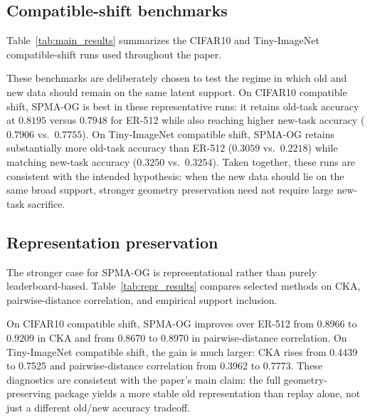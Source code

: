 \documentclass[11pt]{article}
\newcommand{\method}{\textsc{SPMA-OG}}
\begin{document}
\subsection{Compatible-shift benchmarks}
Table~\ref{tab:main_results} summarizes the CIFAR10 and Tiny-ImageNet compatible-shift runs used throughout the paper.

\begin{table}[t]
  \centering
  \caption{Fixed-seed compatible-shift results on CIFAR10 and Tiny-ImageNet.}
  \label{tab:main_results}
  \footnotesize
  \resizebox{\linewidth}{!}{}
\end{table}

These benchmarks are deliberately chosen to test the regime in which old and new data should remain on the same latent support. On CIFAR10 compatible shift, \method{} is best in these representative runs: it retains old-task accuracy at $0.8195$ versus $0.7948$ for ER-512 while also reaching higher new-task accuracy ($0.7906$ vs.\ $0.7755$). On Tiny-ImageNet compatible shift, \method{} retains substantially more old-task accuracy than ER-512 ($0.3059$ vs.\ $0.2218$) while matching new-task accuracy ($0.3250$ vs.\ $0.3254$). Taken together, these runs are consistent with the intended hypothesis: when the new data should lie on the same broad support, stronger geometry preservation need not require large new-task sacrifice.

\subsection{Representation preservation}
The stronger case for \method{} is representational rather than purely leaderboard-based. Table~\ref{tab:repr_results} compares selected methods on CKA, pairwise-distance correlation, and empirical support inclusion.

\begin{table}[t]
  \centering
  \caption{Representation-level diagnostics for the same representative runs. \method{} improves substantially over replay-only in preserving old structure while remaining competitive on new-task accuracy.}
  \label{tab:repr_results}
  \footnotesize
  \resizebox{\linewidth}{!}{}
\end{table}

On CIFAR10 compatible shift, \method{} improves over ER-512 from 0.8966 to 0.9209 in CKA and from 0.8670 to 0.8970 in pairwise-distance correlation. On Tiny-ImageNet compatible shift, the gain is much larger: CKA rises from 0.4439 to 0.7525 and pairwise-distance correlation from 0.3962 to 0.7773. These diagnostics are consistent with the paper's main claim: the full geometry-preserving package yields a more stable old representation than replay alone, not just a different old/new accuracy tradeoff.
\end{document}
